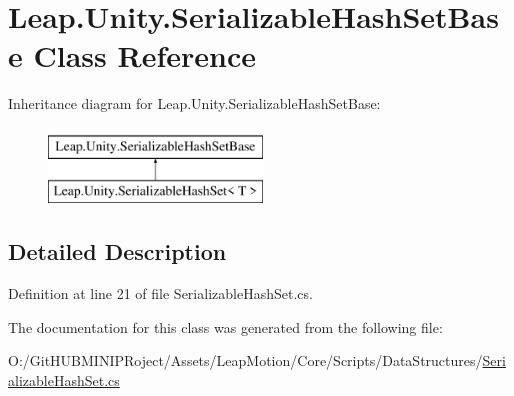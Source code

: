\hypertarget{class_leap_1_1_unity_1_1_serializable_hash_set_base}{}\section{Leap.\+Unity.\+Serializable\+Hash\+Set\+Base Class Reference}
\label{class_leap_1_1_unity_1_1_serializable_hash_set_base}
Inheritance diagram for Leap.\+Unity.\+Serializable\+Hash\+Set\+Base\+:\begin{figure}[H]
\begin{center}
\leavevmode
\includegraphics[height=2.000000cm]{class_leap_1_1_unity_1_1_serializable_hash_set_base}
\end{center}
\end{figure}


\subsection{Detailed Description}


Definition at line 21 of file Serializable\+Hash\+Set.\+cs.



The documentation for this class was generated from the following file\+:\begin{DoxyCompactItemize}
\item 
O\+:/\+Git\+H\+U\+B\+M\+I\+N\+I\+P\+Roject/\+Assets/\+Leap\+Motion/\+Core/\+Scripts/\+Data\+Structures/\mbox{\hyperlink{_serializable_hash_set_8cs}{Serializable\+Hash\+Set.\+cs}}\end{DoxyCompactItemize}
